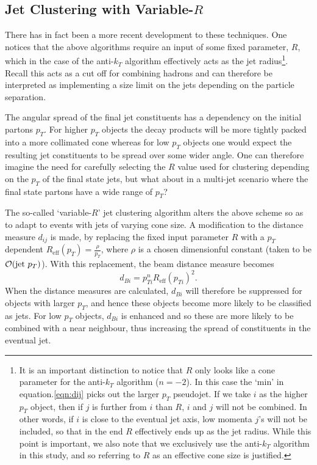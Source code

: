 \documentclass[12pt]{article}
\begin{document}
\subsection{Jet Clustering with Variable-$R$} \label{JetClusteringwithVariableR}
There has in fact been a more recent development to these techniques. One notices that the above algorithms require an input of some fixed parameter, $R$, which in the case of the anti-$k_T$ algorithm effectively acts as the jet radius\footnote{It is an important distinction to notice that $R$ only looks like a cone parameter for the anti-$k_T$ algorithm ($n=-2$). In this case the `min' in equation.\ref{eqn:dij} picks out the larger $p_T$ pseudojet. If we take $i$ as the higher $p_T$ object, then if $j$ is further from $i$ than $R$, $i$ and $j$ will not be combined. In other words, if $i$ is close to the eventual jet axis, low momenta $j$'s will not be included, so that in the end $R$ effectively ends up as the jet radius. While this point is important, we also note that we exclusively use the anti-$k_T$ algorithm in this study, and so referring to $R$ as an effective cone size is justified.}. Recall this acts as a cut off for combining hadrons and can therefore be interpreted as implementing a size limit on the jets depending on the particle separation.

The angular spread of the final jet constituents has a dependency on
the initial partons $p_T$. For higher $p_T$ objects the decay products
will be more tightly packed into a more collimated cone whereas for
low $p_T$ objects one would expect the resulting jet constituents to
be spread over some wider angle. One can therefore
imagine the need for carefully selecting the $R$ value used for
clustering depending on the $p_T$ of the final state jets, but what
about in a multi-jet scenario where the final state partons have a
wide range of $p_T$?

The so-called `variable-$R$' jet clustering algorithm \cite{Krohn:2009zg} alters the above scheme so as to adapt to events with jets of varying cone size. A modification to the distance measure $d_{ij}$ is made, by replacing the fixed input parameter $R$ with a $p_T$ dependent $R_{\text{eff}}(p_T) = \frac{\rho}{p_T}$, where $\rho$ is a chosen dimensionful constant (taken to be ${\cal O} (\text{jet}\ p_T)$). With this replacement, the beam distance measure becomes
%
\begin{equation}
d_{Bi} = p^n_{Ti}R_{\text{eff}}(p_{Ti})^2.
\end{equation}
%
When the distance measures are calculated, $d_{Bi}$ will therefore be suppressed for objects with larger $p_T$, and hence these objects become more likely to be classified as jets. For low $p_T$ objects, $d_{Bi}$ is enhanced and so these are more likely to be combined with a near neighbour, thus increasing the spread of constituents in the eventual jet.
\end{document}
